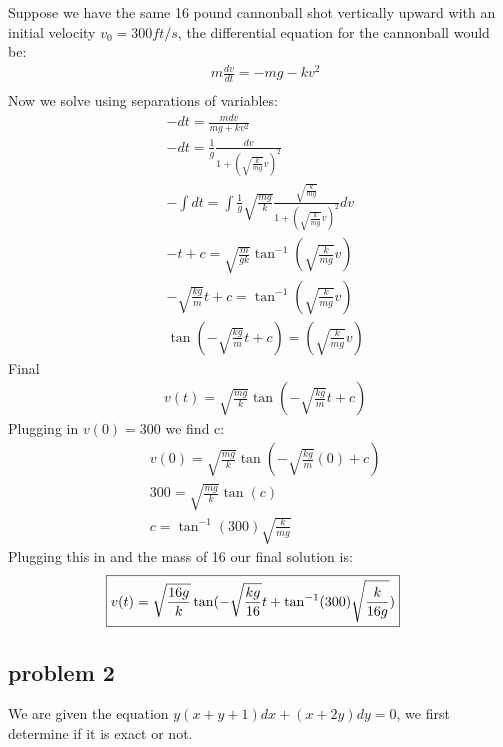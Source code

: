 \documentclass{article}
\begin{document}
\subsubsection{}
Suppose we have the same 16 pound cannonball shot vertically upward with an initial velocity $v_0 = 300 ft/s$, the differential equation for the cannonball would be: 
\setcounter{equation}{0}
\begin{align*}
    & m \frac{dv}{dt} = -mg - kv^2 \\
\end{align*}
Now we solve using separations of variables:
\begin{align}
    & -dt = \frac{mdv}{mg + kv^2} \\
    & -dt = \frac{1}{g} \frac{dv}{1+(\sqrt{\frac{k}{mg}}v)^2} \\
    & -\int dt = \int \frac{1}{g} \sqrt{\frac{mg}{k}} \frac{\sqrt{\frac{k}{mg}}}{1 + (\sqrt{\frac{k}{mg}}v)^2} dv \\
    & -t + c = \sqrt{\frac{m}{gk}} \tan^{-1}(\sqrt{\frac{k}{mg}}v) \\
    & -\sqrt{\frac{kg}{m}}t + c = \tan^{-1}(\sqrt{\frac{k}{mg}}v) \\
    & \tan(-\sqrt{\frac{kg}{m}}t + c) = (\sqrt{\frac{k}{mg}}v)
\end{align}\setcounter{equation}{0}
Final
\begin{align*}
    & v(t) = \sqrt{\frac{mg}{k}} \tan(-\sqrt{\frac{kg}{m}}t + c)
\end{align*}
Plugging in $v(0) = 300$ we find c:
\begin{align}
    & v(0) = \sqrt{\frac{mg}{k}} \tan(-\sqrt{\frac{kg}{m}}(0) + c) \\
    & 300 =  \sqrt{\frac{mg}{k}}\tan(c) \\
    & c = \tan^{-1}(300)\sqrt{\frac{k}{mg}}
\end{align}
Plugging this in and the mass of 16 our final solution is:
\begin{align*}
     \Aboxed{v(t) = \sqrt{\frac{16g}{k}} \tan(-\sqrt{\frac{kg}{16}}t + \tan^{-1}(300)\sqrt{\frac{k}{16g}})}
\end{align*}
\setcounter{subsection}{3}
\subsection{problem 2}
We are given the equation $y(x + y + 1)dx + (x + 2y)dy = 0$, we first determine if it is exact or not.
\setcounter{subsubsection}{1}
\end{document}
